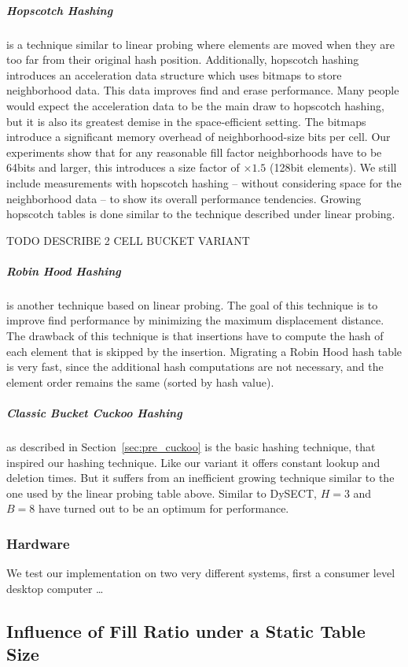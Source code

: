 \documentclass[a4paper,UKenglish]{lipics-v2016}
\begin{document}
\subparagraph*{Hopscotch Hashing} is a technique similar to linear probing where
elements are moved when they are too far from their original hash
position.  Additionally, hopscotch hashing introduces an acceleration
data structure which uses bitmaps to store neighborhood data. This
data improves find and erase performance.  Many people would expect
the acceleration data to be the main draw to hopscotch hashing, but it
is also its greatest demise in the space-efficient setting.  The
bitmaps introduce a significant memory overhead of neighborhood-size
bits per cell.  Our experiments show that for any reasonable fill
factor neighborhoods have to be 64bits and larger, this introduces a
size factor of $\times1.5$ (128bit elements).  We still include
measurements with hopscotch hashing -- without considering space for
the neighborhood data -- to show its overall performance tendencies.
Growing hopscotch tables is done similar to the technique described
under linear probing.

TODO DESCRIBE 2 CELL BUCKET VARIANT

\subparagraph*{Robin Hood Hashing} is another technique based on linear probing. The
goal of this technique is to improve find performance by minimizing
the maximum displacement distance.  The drawback of this
technique is that insertions have to compute the hash of each element
that is skipped by the insertion.  Migrating a Robin Hood hash table
is very fast, since the additional hash computations are not
necessary, and the element order remains the same (sorted by hash value).

\subparagraph*{Classic Bucket Cuckoo Hashing} as described in
Section~\ref{sec:pre_cuckoo} is the basic hashing technique, that
inspired our hashing technique.  Like our variant it offers constant
lookup and deletion times.  But it suffers from an inefficient growing
technique similar to the one used by the linear probing table above.
Similar to DySECT, $H=3$ and $B=8$ have turned out to be an optimum
for performance.

\subsubsection*{Hardware}
We test our implementation on two very different systems, first a
consumer level desktop computer \ldots{}

\subsection{Influence of Fill Ratio under a Static Table Size}
\label{sec:exp_eps}
\end{document}
